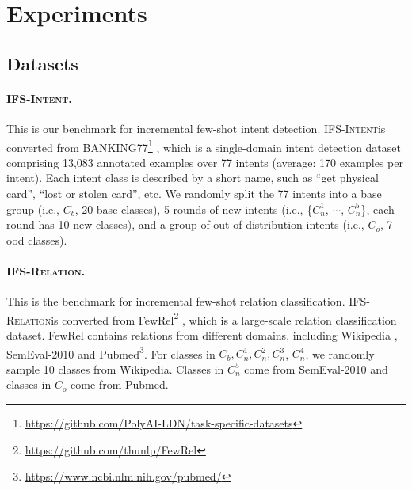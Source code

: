 \documentclass[11pt]{article}
\newcommand{\intentdata}{\textsc{IFS-Intent}}
\newcommand{\relationdata}{\textsc{IFS-Relation}}
\begin{document}
\section{Experiments}

\subsection{Datasets}

\paragraph{\intentdata.} This is our benchmark for incremental few-shot intent detection. \intentdata\enspace is converted from BANKING77\footnote{\url{https://github.com/PolyAI-LDN/task-specific-datasets}} \cite{casanueva2020efficient}, which is a single-domain intent
detection dataset comprising 13,083 annotated
examples over 77 intents (average: 170 examples per intent). Each intent class is described by a short name, such as ``get physical card'', ``lost or stolen card'', etc. We randomly split the 77 intents into a base group (i.e., $C_b$, 20 base classes), 5 rounds of new intents (i.e., \{$C_n^1$, $\cdots$, $C_n^5$\}, each round has 10 new classes), and a group of out-of-distribution intents (i.e., $C_o$, 7 ood classes). 



\paragraph{\relationdata.} This is the benchmark for incremental few-shot relation classification. \relationdata\enspace is converted from FewRel\footnote{\url{https://github.com/thunlp/FewRel}} \cite{han2018fewrel}, which is a large-scale relation classification dataset. FewRel contains relations from different domains, including Wikipedia \cite{vrandevcic2014wikidata}, SemEval-2010 \cite{hendrickx2019semeval} and Pubmed\footnote{\url{https://www.ncbi.nlm.nih.gov/pubmed/}}. For classes in $C_b, C_n^1, C_n^2, C_n^3$, $C_n^4$, we randomly sample 10 classes from Wikipedia. Classes in $C_n^5$ come from SemEval-2010 and classes in $C_o$ come from Pubmed. 
\end{document}
